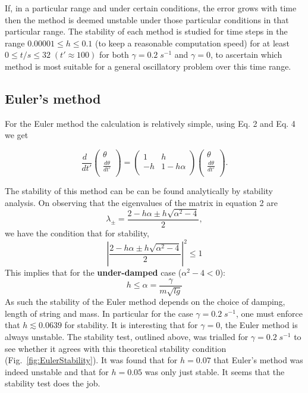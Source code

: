 \documentclass[10pt,a4paper]{article}
\begin{document}
If, in a particular range and under certain conditions, the error grows with time then the method is deemed unstable under those particular conditions in that particular range. The stability of each method is studied for time steps in the range $0.00001\leq h\leq0.1$ (to keep a reasonable computation speed) for at least $0\leq t/s \leq 32\; (t' \approx 100)$  for both $\gamma = 0.2\; s^{-1}$ and $\gamma = 0$, to ascertain which method is most suitable for a general oscillatory problem over this time range.

\subsection{Euler's method}
For the Euler method the calculation is relatively simple, using Eq. 2 and Eq. 4 we get

\begin{equation}
 \frac{d\phantom{0}}{dt'}      
     \begin{pmatrix}
       \theta        \\[0.1em]
        \frac{d\theta}{dt'}              \\[0.1em]
     \end{pmatrix}
= 
     \begin{pmatrix}
       1 & h        \\[0.2em]
       -h & 1-h\alpha     \\[0.2em]
     \end{pmatrix}
     \begin{pmatrix}
       \theta        \\[0.1em]
        \frac{d\theta}{dt'}              \\[0.1em]
     \end{pmatrix}.
\end{equation}

The stability of this method can be can be found analytically by stability analysis. On observing that the eigenvalues of the matrix in equation 2 are
\begin{equation}
\lambda_{\pm} = \frac{2-h\alpha \pm h\sqrt{\alpha^2 - 4}}{2},
\end{equation}
we have the condition that for stability,
\begin{equation}
\left|\frac{2 -h\alpha \pm h\sqrt{\alpha^2 - 4}}{2}\right|^2 \leq 1
\end{equation}
This implies that for the \textbf{under-damped} case ($\alpha^2-4<0$): 
\begin{equation}
h\leq \alpha=\frac{\gamma}{m\sqrt{lg}}
\end{equation}
As such the stability of the Euler method depends on the choice of damping, length of string and mass. In particular for the case $\gamma = 0.2\; s^{-1}$, one must enforce that $h \lesssim 0.0639$ for stability. It is interesting that for $\gamma=0$, the Euler method is always unstable. The stability test, outlined above, was trialled for $\gamma = 0.2\; s^{-1}$ to see whether it agrees with this theoretical stability condition (Fig.~\ref{fig:EulerStability}). It was found that for $h=0.07$ that Euler's method was indeed unstable and that for $h=0.05$ was only just stable. It seems that the stability test does the job.
\end{document}
